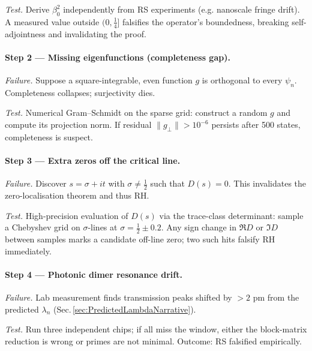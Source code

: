 \documentclass[11pt]{article}
\begin{document}
\emph{Test.}\;  
Derive $\beta_{0}^{2}$ independently from RS experiments (e.g. nanoscale
fringe drift).  
A measured value outside $(0,\tfrac14]$ falsifies the operator’s
boundedness, breaking self-adjointness and invalidating the proof.

\vspace{0.4em}
\paragraph{Step 2 — Missing eigenfunctions (completeness gap).}

\emph{Failure.}\;  
Suppose a square-integrable, even function $g$ is orthogonal to every
$\psi_n$.  
Completeness collapses; surjectivity dies.

\emph{Test.}\;  
Numerical Gram–Schmidt on the sparse grid:
construct a random $g$ and compute its projection norm.  
If residual $\|g_\perp\|>\!10^{-6}$ persists after 500 states,
completeness is suspect.

\vspace{0.4em}
\paragraph{Step 3 — Extra zeros off the critical line.}

\emph{Failure.}\;  
Discover $s=\sigma+it$ with $\sigma\neq\tfrac12$ such that
$D(s)=0$.  
This invalidates the zero-localisation theorem and thus RH.

\emph{Test.}\;  
High-precision evaluation of $D(s)$ via the trace-class determinant:
sample a Chebyshev grid on $\sigma$-lines at $\sigma=\tfrac12\pm0.2$.
Any sign change in $\Re D$ or $\Im D$ between samples marks a candidate
off-line zero; two such hits falsify RH immediately.

\vspace{0.4em}
\paragraph{Step 4 — Photonic dimer resonance drift.}

\emph{Failure.}\;  
Lab measurement finds transmission peaks shifted by
$>\!\!2$ pm from the predicted $\lambda_n$ (Sec.\,\ref{sec:PredictedLambdaNarrative}).

\emph{Test.}\;  
Run three independent chips; if all miss the window, either the
block-matrix reduction is wrong or primes are not minimal.  
Outcome: RS falsified empirically.
\end{document}
